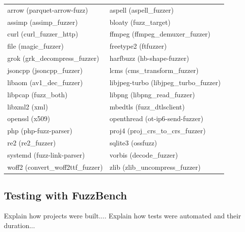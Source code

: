 \begin{tabularx}{\textwidth}{
    @{\hspace{2em}}%
    >{\leavevmode\llap{\textbullet~}\raggedright\rule{0pt}{3ex}}%
    X%
    @{\quad\hspace{1em}}%
    >{\leavevmode\llap{\textbullet~}\raggedright\arraybackslash}%
    X%
    @{}%
  }
  arrow (parquet-arrow-fuzz) & aspell (aspell\_fuzzer) \\
  assimp (assimp\_fuzzer) & bloaty (fuzz\_target) \\
  curl (curl\_fuzzer\_http) & ffmpeg (ffmpeg\_demuxer\_fuzzer) \\
  file (magic\_fuzzer) & freetype2 (ftfuzzer) \\
  grok (grk\_decompress\_fuzzer) & harfbuzz (hb-shape-fuzzer) \\
  jsoncpp (jsoncpp\_fuzzer) & lcms (cms\_transform\_fuzzer) \\
  libaom (av1\_dec\_fuzzer) & libjpeg-turbo (libjpeg\_turbo\_fuzzer) \\
  libpcap (fuzz\_both) & libpng (libpng\_read\_fuzzer) \\
  libxml2 (xml) & mbedtls (fuzz\_dtlsclient) \\
  openssl (x509) & openthread (ot-ip6-send-fuzzer) \\
  php (php-fuzz-parser) & proj4 (proj\_crs\_to\_crs\_fuzzer) \\
  re2 (re2\_fuzzer) & sqlite3 (ossfuzz) \\
  systemd (fuzz-link-parser) & vorbis (decode\_fuzzer) \\
  woff2 (convert\_woff2ttf\_fuzzer) & zlib (zlib\_uncompress\_fuzzer)  
\end{tabularx}




\newpage
\subsection{Testing with FuzzBench}
Explain how projects were built....
\newline \newline
Explain how tests were automated and their duration...







